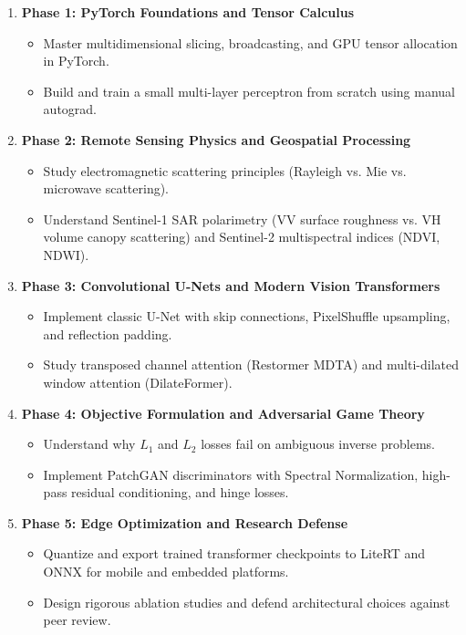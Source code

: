 \begin{enumerate}
    \item \textbf{Phase 1: PyTorch Foundations and Tensor Calculus}
    \begin{itemize}
        \item Master multidimensional slicing, broadcasting, and GPU tensor allocation in PyTorch.
        \item Build and train a small multi-layer perceptron from scratch using manual autograd.
    \end{itemize}
    \item \textbf{Phase 2: Remote Sensing Physics and Geospatial Processing}
    \begin{itemize}
        \item Study electromagnetic scattering principles (Rayleigh vs. Mie vs. microwave scattering).
        \item Understand Sentinel-1 SAR polarimetry (VV surface roughness vs. VH volume canopy scattering) and Sentinel-2 multispectral indices (NDVI, NDWI).
    \end{itemize}
    \item \textbf{Phase 3: Convolutional U-Nets and Modern Vision Transformers}
    \begin{itemize}
        \item Implement classic U-Net with skip connections, PixelShuffle upsampling, and reflection padding.
        \item Study transposed channel attention (Restormer MDTA) and multi-dilated window attention (DilateFormer).
    \end{itemize}
    \item \textbf{Phase 4: Objective Formulation and Adversarial Game Theory}
    \begin{itemize}
        \item Understand why $L_1$ and $L_2$ losses fail on ambiguous inverse problems.
        \item Implement PatchGAN discriminators with Spectral Normalization, high-pass residual conditioning, and hinge losses.
    \end{itemize}
    \item \textbf{Phase 5: Edge Optimization and Research Defense}
    \begin{itemize}
        \item Quantize and export trained transformer checkpoints to LiteRT and ONNX for mobile and embedded platforms.
        \item Design rigorous ablation studies and defend architectural choices against peer review.
    \end{itemize}
\end{enumerate}

